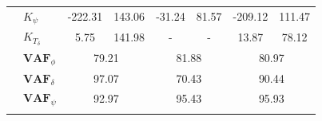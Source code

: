 \begin{table}[]
\begin{tabular}{llcccccc}
                                                   & $K_\psi $                                              & -222.31                                     & 143.06                                               & -31.24                                      & 81.57                                                & -209.12                                     & 111.47                                               \\
                                                   & $K_{T_\delta}$                                         & 5.75                                        & 141.98                                               & -                                           & -                                                    & 13.87                                       & 78.12                                                \\ \cline{2-8} 
                                                   & $\mathbf{VAF}_\phi$                                    & \multicolumn{2}{c}{79.21}                                                                          & \multicolumn{2}{c}{81.88}                                                                          & \multicolumn{2}{c}{80.97}                                                                          \\
                                                   & $\mathbf{VAF}_\delta$                                  & \multicolumn{2}{c}{97.07}                                                                          & \multicolumn{2}{c}{70.43}                                                                          & \multicolumn{2}{c}{90.44}                                                                          \\
                                                   & $\mathbf{VAF}_\psi$                                    & \multicolumn{2}{c}{92.97}                                                                          & \multicolumn{2}{c}{95.43}                                                                          & \multicolumn{2}{c}{95.93}                                                                          \\
                                                   &                                                        & \multicolumn{1}{l}{}                        & \multicolumn{1}{l}{}                                 & \multicolumn{1}{l}{}                        & \multicolumn{1}{l}{}                                 & \multicolumn{1}{l}{}                        & \multicolumn{1}{l}{}                                 \\ \hline

\end{tabular}
\end{table}

